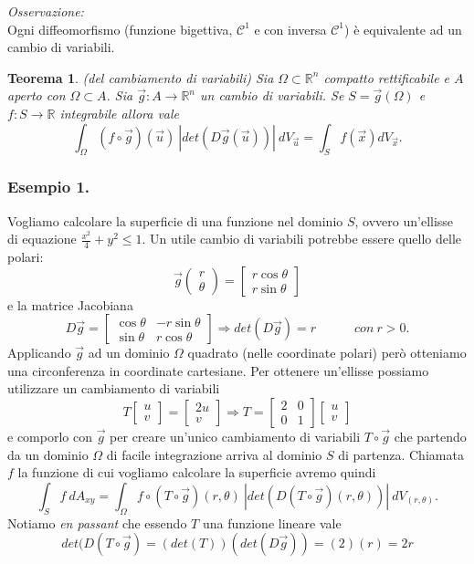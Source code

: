 \documentclass[10pt]{article}
\theoremstyle{plain}
\newtheorem{thm}{Teorema}[section]
\theoremstyle{definition}
\begin{document}
\textit{Osservazione:}
\\ Ogni diffeomorfismo (funzione bigettiva, $\mathcal{C}^1$ e con inversa $\mathcal{C}^1$) è equivalente ad un cambio di variabili.

\begin{thm}
(del cambiamento di variabili) Sia $\Omega \subset \mathbb{R}^n$ compatto rettificabile e $A$ aperto con $\Omega \subset A$. Sia $\vec{g}:A\to \mathbb{R}^n$ un cambio di variabili. Se $S=\vec{g}(\Omega)$ e $f:S\to \mathbb{R}$ integrabile allora vale 
$$\int_{\Omega} (f\circ \vec{g})(\vec{u})\ |det(D\vec{g}(\vec{u}))|\ dV_{\vec{u}}=\int_Sf(\vec{x}) dV_{\vec{x}}.$$
\end{thm}
\bigskip


\subsubsection{Esempio 1.}
Vogliamo calcolare la superficie di una funzione nel dominio $S$, ovvero un'ellisse di equazione $\frac{x^2}{4}+y^2\leq 1$. 
Un utile cambio di variabili potrebbe essere quello delle polari:
$$
\vec{g}\left(\begin{matrix}  r \\ \theta  \end{matrix}\right)=
\begin{bmatrix}
r\cos \theta \\ r\sin \theta
\end{bmatrix}
$$
e la matrice Jacobiana
$$
D\vec{g}=
\begin{bmatrix}
\cos \theta & -r\sin\theta \\ \sin \theta & r\cos\theta
\end{bmatrix}
\Longrightarrow det(D\vec{g})=r\qquad \quad con\ r>0.
$$
Applicando $\vec{g}$ ad un dominio $\Omega$ quadrato (nelle coordinate polari) però otteniamo una circonferenza in coordinate cartesiane. 
Per ottenere un'ellisse possiamo utilizzare un cambiamento di variabili 
$$T
\begin{bmatrix}
u \\ v
\end{bmatrix}
=
\begin{bmatrix}
2u \\
v
\end{bmatrix}\Longrightarrow T = 
\begin{bmatrix}
2 & 0\\ 0 & 1
\end{bmatrix}
\begin{bmatrix}
u \\ v
\end{bmatrix}$$
e comporlo con $\vec{g}$ per creare un'unico cambiamento di variabili $T\circ \vec{g}$ che partendo da un dominio $\Omega$ di facile integrazione arriva al dominio $S$ di partenza.
Chiamata $f$ la funzione di cui vogliamo calcolare la superficie avremo quindi
$$\int_Sf\ dA_{xy} = \int_{\Omega}f\circ(T\circ \vec{g})(r, \theta) \ |det(D(T\circ \vec{g})(r,\theta))|\ dV_{(r,\theta)}.
$$
Notiamo \textit{en passant} che essendo $T$ una funzione lineare vale
$$det(D(T\circ \vec{g}) = (det(T))(det(D\vec{g}))=(2)(r)= 2r
$$
\end{document}

